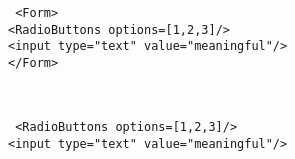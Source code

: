 \documentclass{article}
\begin{document}

\vspace*{\fill}
    {
        \Huge
        \color{light-gray}
        \texttt{%
<Form>\hspace*{\fill}\\ %
    \hspace*{1em}\mbox{<RadioButtons options={[1,2,3]}/>}\\
    \hspace*{1em}\mbox{<input type="text" value="meaningful"/>}\\
</Form> 
        }
    }

\
\vspace*{\fill}

\vspace{\baselineskip}
\noindent
\begin{minipage}[t][][t]{\linewidth}
    \Huge
    \texttt{%
<RadioButtons options={[1,2,3]}/>\\
<input type="text" value="meaningful"/>\\
}
\end{minipage}
\end{document}
